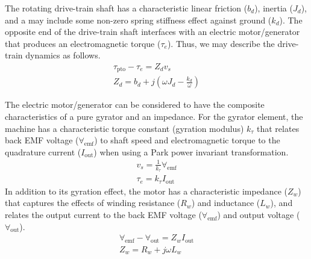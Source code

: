 \documentclass[lettersize,journal]{IEEEtran}
\newcommand{\rc}[1]{\textcolor{red}{#1}}
\begin{document}
The rotating drive-train shaft has a characteristic linear friction ($b_d$), inertia ($J_d$), and a may include some non-zero spring stiffness effect against ground ($k_d$).
The opposite end of the drive-train shaft interfaces with an electric motor/generator that produces an electromagnetic torque ($\tau_e$).
Thus, we may describe the drive-train dynamics as follows.
%
\begin{subequations}
        \begin{gather}
                \tau_{\textrm{pto}} - \tau_e = Z_d v_s \\
                Z_d = b_d + j \left( \omega J_d - \frac{k_d}{\omega} \right)
        \end{gather}
\end{subequations}

The electric motor/generator can be considered to have the composite characteristics of a pure gyrator and an impedance.
For the gyrator element, the machine has a characteristic torque constant (gyration modulus) $k_\tau$ that relates back EMF voltage ($\forall_{\textrm{emf}}$) to shaft speed and electromagnetic torque to the quadrature current ($I_{\textrm{out}}$) when using a Park power invariant transformation.
%
\begin{subequations}
        \begin{gather}
                v_s = \frac{1}{k_\tau}\forall_{\textrm{emf}} \\
                \tau_e = k_\tau I_{\textrm{out}}
        \end{gather}
\end{subequations}
%
In addition to its gyration effect, the motor has a characteristic impedance ($Z_w$) that captures the effects of winding resistance ($R_w$) and inductance ($L_w$), and relates the output current to the back EMF voltage ($\forall_{\textrm{emf}}$) and output voltage ($\forall_{\textrm{out}}$).
%
\begin{subequations}
        \begin{gather}
                \forall_{\textrm{emf}} - \forall_{\textrm{out}} = Z_w I_{\textrm{out}}\\
                Z_w = R_w + j \omega L_w \label{eq:winding_impedance}
        \end{gather}
\end{subequations}
\end{document}
